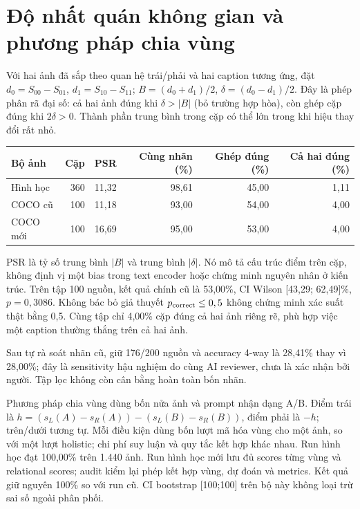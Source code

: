 \documentclass[11pt,a4paper]{article}
\begin{document}
\newpage
\section{Độ nhất quán không gian và phương pháp chia vùng}
Với hai ảnh đã sắp theo quan hệ trái/phải và hai caption tương ứng, đặt $d_0=S_{00}-S_{01}$, $d_1=S_{10}-S_{11}$; $B=(d_0+d_1)/2$, $\delta=(d_0-d_1)/2$. Đây là phép phân rã đại số: cả hai ảnh đúng khi $\delta>|B|$ (bỏ trường hợp hòa), còn ghép cặp đúng khi $2\delta>0$. Thành phần trung bình trong cặp có thể lớn trong khi hiệu thay đổi rất nhỏ.

\begin{center}\small
{}
\begin{tabular}{@{}lrrrrr@{}}\toprule
Bộ ảnh & Cặp & PSR & Cùng nhãn (\%) & Ghép đúng (\%) & Cả hai đúng (\%)\\\midrule
Hình học & 360 & 11,32 & 98,61 & 45,00 & 1,11\\
COCO cũ & 100 & 11,18 & 93,00 & 54,00 & 4,00\\
COCO mới & 100 & 16,69 & 95,00 & 53,00 & 4,00\\
\bottomrule\end{tabular}\end{center}

PSR là tỷ số trung bình $|B|$ và trung bình $|\delta|$. Nó mô tả cấu trúc điểm trên cặp, không định vị một bias trong text encoder hoặc chứng minh nguyên nhân ở kiến trúc. Trên tập 100 nguồn, kết quả chính cũ là 53,00\%, CI Wilson [43,29; 62,49]\%, $p=0,3086$. Không bác bỏ giả thuyết $p_{\rm correct}\leq0,5$ không chứng minh xác suất thật bằng 0,5. Cùng tập chỉ 4,00\% cặp đúng cả hai ảnh riêng rẽ, phù hợp việc một caption thường thắng trên cả hai ảnh.

Sau tự rà soát nhãn cũ, giữ 176/200 nguồn và accuracy 4-way là 28,41\% thay vì 28,00\%; đây là sensitivity hậu nghiệm do cùng AI reviewer, chưa là xác nhận bởi người. Tập lọc không còn cân bằng hoàn toàn bốn nhãn.

Phương pháp chia vùng dùng bốn nửa ảnh và prompt nhận dạng A/B. Điểm trái là $h=(s_L(A)-s_R(A))-(s_L(B)-s_R(B))$, điểm phải là $-h$; trên/dưới tương tự. Mỗi điều kiện dùng bốn lượt mã hóa vùng cho một ảnh, so với một lượt holistic; chi phí suy luận và quy tắc kết hợp khác nhau. Run hình học đạt 100,00\% trên 1.440 ảnh. Run hình học mới lưu đủ scores từng vùng và relational scores; audit kiểm lại phép kết hợp vùng, dự đoán và metrics. Kết quả giữ nguyên 100\% so với run cũ. CI bootstrap [100;100] trên bộ này không loại trừ sai số ngoài phân phối.
\end{document}
